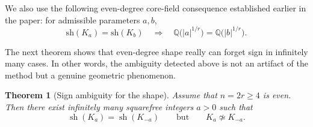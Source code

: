 \documentclass[11pt,letterpaper]{amsart}
\newcommand{\Q}{\mathbb{Q}}
\newcommand{\sh}{\mathrm{sh}}
\theoremstyle{plain}
\newtheorem{theorem}{Theorem}[section]
\theoremstyle{definition}
\begin{document}
We also use the following even-degree core-field consequence established earlier in the paper:
for admissible parameters \(a,b\),
\begin{equation}\label{eq:even-core-field-consequence}
\sh(K_a)=\sh(K_b)
\quad\Longrightarrow\quad
\Q\!\bigl(|a|^{1/r}\bigr)=\Q\!\bigl(|b|^{1/r}\bigr).
\end{equation}

The next theorem shows that even-degree shape really can forget sign in infinitely many cases. In other words, the ambiguity detected above is not an artifact of the method but a genuine geometric phenomenon.

\begin{theorem}[Sign ambiguity for the shape]\label{thm:even-Sh-ambiguity}
Assume that $n=2r \geq 4$ is even.
Then there exist infinitely many squarefree integers $a>0$ such that
\[
\operatorname{sh}(K_a)=\operatorname{sh}(K_{-a})
\qquad\text{but}\qquad
K_a\not\simeq K_{-a}.
\]
\end{theorem}
\end{document}
